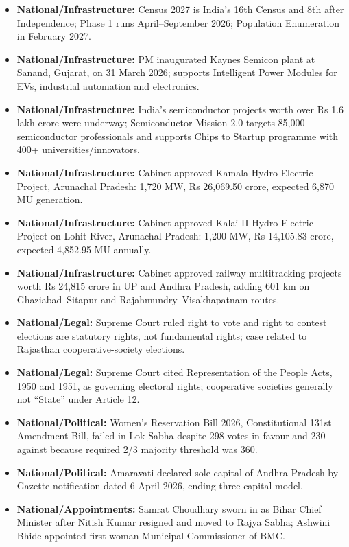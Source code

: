 \documentclass[10pt,a4paper]{article}
\begin{document}
\begin{itemize}
    \item \textbf{National/Infrastructure:} Census 2027 is India's 16th Census and 8th after Independence; Phase 1 runs April--September 2026; Population Enumeration in February 2027.
    \item \textbf{National/Infrastructure:} PM inaugurated Kaynes Semicon plant at Sanand, Gujarat, on 31 March 2026; supports Intelligent Power Modules for EVs, industrial automation and electronics.
    \item \textbf{National/Infrastructure:} India's semiconductor projects worth over Rs 1.6 lakh crore were underway; Semiconductor Mission 2.0 targets 85,000 semiconductor professionals and supports Chips to Startup programme with 400+ universities/innovators.
    \item \textbf{National/Infrastructure:} Cabinet approved Kamala Hydro Electric Project, Arunachal Pradesh: 1,720 MW, Rs 26,069.50 crore, expected 6,870 MU generation.
    \item \textbf{National/Infrastructure:} Cabinet approved Kalai-II Hydro Electric Project on Lohit River, Arunachal Pradesh: 1,200 MW, Rs 14,105.83 crore, expected 4,852.95 MU annually.
    \item \textbf{National/Infrastructure:} Cabinet approved railway multitracking projects worth Rs 24,815 crore in UP and Andhra Pradesh, adding 601 km on Ghaziabad--Sitapur and Rajahmundry--Visakhapatnam routes.
    \item \textbf{National/Legal:} Supreme Court ruled right to vote and right to contest elections are statutory rights, not fundamental rights; case related to Rajasthan cooperative-society elections.
    \item \textbf{National/Legal:} Supreme Court cited Representation of the People Acts, 1950 and 1951, as governing electoral rights; cooperative societies generally not ``State'' under Article 12.
    \item \textbf{National/Political:} Women's Reservation Bill 2026, Constitutional 131st Amendment Bill, failed in Lok Sabha despite 298 votes in favour and 230 against because required 2/3 majority threshold was 360.
    \item \textbf{National/Political:} Amaravati declared sole capital of Andhra Pradesh by Gazette notification dated 6 April 2026, ending three-capital model.
    \item \textbf{National/Appointments:} Samrat Choudhary sworn in as Bihar Chief Minister after Nitish Kumar resigned and moved to Rajya Sabha; Ashwini Bhide appointed first woman Municipal Commissioner of BMC.

\end{itemize}
\end{document}
